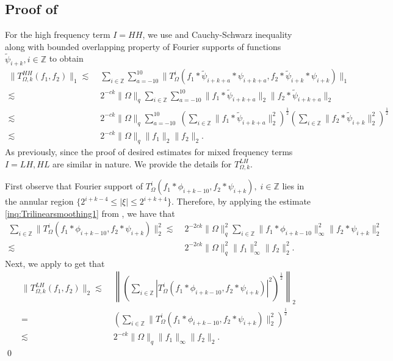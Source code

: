 \documentclass[a4paper,reqno]{amsart}
\newcommand{\Z}{{\mathbb Z}}
\theoremstyle{definition}
\numberwithin{equation}{section}
\begin{document}
\subsection{Proof of }
	For the high frequency term $I=HH$, we use  and Cauchy-Schwarz inequality along with bounded overlapping property of Fourier supports of functions $\widetilde{\psi}_{i+k},i\in\Z$ to obtain
	\begin{align*}
		\|T_{\Omega,k}^{HH}(f_1,f_2)\|_1\lesssim&\;\sum_{i\in\Z}\sum_{a=-10}^{10}\|T^i_\Omega(f_1*\widetilde{\psi}_{i+k+a}*\psi_{i+k+a},f_2*\widetilde{\psi}_{i+k}*\psi_{i+k})\|_1\\
		\lesssim&\;2^{-ck}\|\Omega\|_q\sum_{i\in\Z}\sum_{a=-10}^{10}\|f_1*\widetilde{\psi}_{i+k+a}\|_2\|f_2*\widetilde{\psi}_{i+k+a}\|_2\\
		\lesssim&\;2^{-ck}\|\Omega\|_q\sum_{a=-10}^{10}\;\left(\sum_{i\in\Z}\|f_1*\widetilde{\psi}_{i+k+a}\|_2^2\right)^\frac{1}{2}\left(\sum_{i\in\Z}\|f_2*\widetilde{\psi}_{i+k}\|_2^2\right)^\frac{1}{2}\\
		\lesssim&\;2^{-ck}\|\Omega\|_q\|f_1\|_2\|f_2\|_2.
	\end{align*}
	As previously, since the proof of desired estimates for mixed frequency terms $I=LH,HL$ are similar in nature. We provide the details for $T_{\Omega,k}^{LH}$. 
	
	First observe that Fourier support of $T_{\Omega}^i(f_1*\phi_{i+k-10},f_2*\psi_{i+k}),\;i\in\Z$ lies in the annular region  $\{2^{i+k-4} \leq|\xi| \leq 2^{i+k+4}\}$. Therefore, by applying the estimate \eqref{inq:Trilinearsmoothing1} from , we have that
	\begin{align*}
		\sum_{i\in\Z}\|T_{\Omega}^i(f_1*\phi_{i+k-10},f_2*\psi_{i+k})\|_2^2\lesssim&\;2^{-2ck}\|\Omega\|_q^2\sum_{i\in\Z}\|f_1*\phi_{i+k-10}\|_\infty^2\|f_2*\psi_{i+k}\|_2^2\\
		\lesssim&\;2^{-2ck}\|\Omega\|_q^2\|f_1\|_\infty^2\|f_2\|_2^2.
	\end{align*}
	Next, we apply  to get that 
	\begin{align*}
		\|T_{\Omega,k}^{LH}(f_1,f_2)\|_2\lesssim&\;\left\|\left(\sum_{i \in \Z}\left|T_{\Omega}^i(f_1*\phi_{i+k-10},f_2*\psi_{i+k})\right|^2\right)^{\frac{1}{2}}\right\|_{2}\\
		=&\;\left(\sum_{i\in\Z}\|T_{\Omega}^i(f_1*\phi_{i+k-10},f_2*\psi_{i+k})\|_2^2\right)^\frac{1}{2}\\
		\lesssim&\;2^{-ck}\|\Omega\|_q\|f_1\|_\infty\|f_2\|_2.
	\end{align*}
\qed
\end{document}
